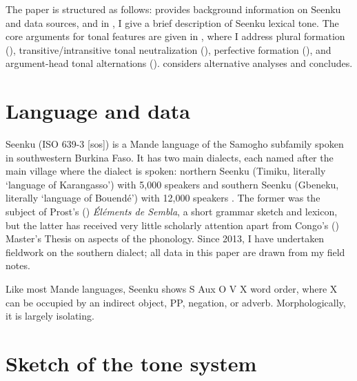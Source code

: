 \documentclass[output=paper]{langsci/langscibook}
\begin{document}
The paper is structured as follows:  provides background information on Seenku and data sources, and in , I give a brief description of Seenku lexical tone. The core arguments for tonal features are given in , where I address plural formation (), transitive/intransitive tonal neutralization (), perfective formation (), and argument-head tonal alternations ().  considers alternative analyses and  concludes.





\section{Language and data}\label{sec:mcpherson:SecBackground}


Seenku (ISO 639-3 [sos]) is a Mande language of the Samogho subfamily spoken in southwestern Burkina Faso. It has two main dialects, each named after the main village where the dialect is spoken: northern Seenku (Timiku, literally `language of Karangasso') with 5,000 speakers and southern Seenku (Gbeneku, literally `language of Bouend\'e') with 12,000 speakers \citep{Ethnologue}. The former was the subject of Prost's (\citeyear{Prost71}) {\it \'El\'ements de Sembla}, a short grammar sketch and lexicon, but the latter has received very little scholarly attention apart from Congo's (\citeyear{Congo13}) Master's Thesis on aspects of the phonology. Since 2013, I have undertaken fieldwork on the southern dialect; all data in this paper are drawn from my field notes.

Like most Mande languages, Seenku shows S Aux O V X word order, where X can be occupied by an indirect object, PP, negation, or adverb. Morphologically, it is largely isolating.

\section{Sketch of the tone system}\label{sec:mcpherson:SecTone}
\end{document}
